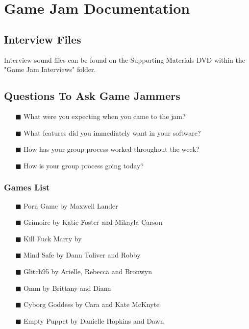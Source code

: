 
\chapter{Game Jam Documentation} %

\label{AppendixB} %



\section{Interview Files}
Interview sound files can be found on the Supporting Materials DVD within the "Game Jam Interviews" folder.

\section{Questions To Ask Game Jammers}


\begin{itemize} 
\item[\tiny{$\blacksquare$}] What were you expecting when you came to the jam?
\item[\tiny{$\blacksquare$}] What features did you immediately want in your software?
\item[\tiny{$\blacksquare$}] How has your group process worked throughout the week?
\item[\tiny{$\blacksquare$}] How is your group process going today?
\end{itemize}

\subsection{Games List}
\begin{itemize} 
\item[\tiny{$\blacksquare$}] Porn Game by Maxwell Lander
\item[\tiny{$\blacksquare$}] Grimoire by Katie Foster and Mikayla Carson
\item[\tiny{$\blacksquare$}] Kill Fuck Marry by 
\item[\tiny{$\blacksquare$}] Mind Safe by Dann Toliver and Robby
\item[\tiny{$\blacksquare$}] Glitch95 by Arielle, Rebecca and Bronwyn
\item[\tiny{$\blacksquare$}] Omm by Brittany and Diana
\item[\tiny{$\blacksquare$}] Cyborg Goddess by Cara and Kate McKnyte
\item[\tiny{$\blacksquare$}] Empty Puppet by Danielle Hopkins and Dawn
\end{itemize}

